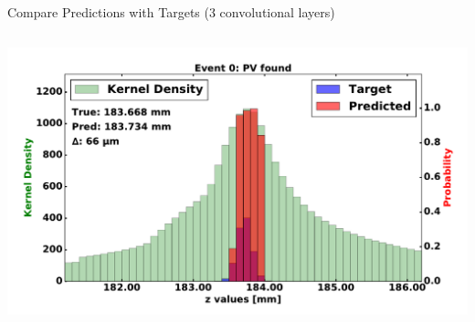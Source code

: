 \begin{frame}{Compare Predictions with Targets (3 convolutional layers)}
\begin{columns}[c]
\begin{center}
           \includegraphics[width=1\textwidth, height=0.45\textwidth, trim=18 0 18 0]{images/120000_3layer_03.pdf}
       \end{center}
  \end{columns}
\end{frame}

